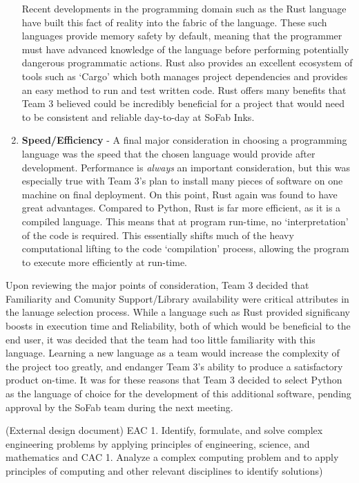\documentclass{article}
\begin{document}
\begin{enumerate}
        Recent developments in the programming domain such as the Rust language have built 
        this fact of reality into the fabric of the language. These such languages provide memory safety by default, meaning that the 
        programmer must have advanced knowledge of the language before performing potentially dangerous programmatic actions. Rust also 
        provides an excellent ecosystem of tools such as `Cargo' which both manages project dependencies and provides an easy method to
        run and test written code. Rust offers many benefits that Team 3 believed could be incredibly beneficial for a project that would 
        need to be consistent and reliable day-to-day at SoFab Inks.
    \item \textbf{Speed\slash Efficiency} - A final major consideration in choosing a programming language was the speed that the chosen
        language would provide after development. Performance is \textit{always} an important consideration, but this was  
        especially true with Team 3's plan to install many pieces of software on one machine on final deployment. On this point, Rust 
        again was found to have great advantages. Compared to Python, Rust is far more efficient, as it is 
        a compiled language. This means that at program run-time, no `interpretation' of the code is required. This essentially shifts much
        of the heavy computational lifting to the code `compilation' process, allowing the program to execute more efficiently at run-time. 
\end{enumerate}

Upon reviewing the major points of consideration, Team 3 decided that Familiarity and Comunity Support\slash Library availability were 
critical attributes in the lanuage selection process. While a language such as Rust provided significany boosts in execution time
and Reliability, both of which would be beneficial to the end user, it was decided that the team had too little familiarity with this 
language. Learning a new language as a team would increase the complexity of the project too greatly, and endanger Team 3's ability to
produce a satisfactory product on-time. It was for these reasons that Team 3 decided to select Python as the language of choice for the 
development of this additional software, pending approval by the SoFab team during the next meeting. 


(External design document) 
    EAC 1. Identify, formulate, and solve complex engineering problems by 
    applying principles of engineering, science, and mathematics and CAC 1. 
    Analyze a complex computing problem and to apply principles of computing 
    and other relevant disciplines to identify solutions) 
\end{document}
